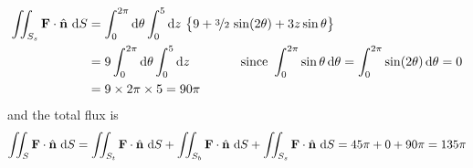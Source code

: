 \begin{eg}
\begin{align*}
\iint_{S_s}\mathbf{F}\cdot\hat{\mathbf{n}}\ \mathrm{d}S
&=\int_0^{2\pi}\mathrm{d}\theta\int_0^5\mathrm{d}z\  
     \big\{9 +\nicefrac{3}{2}\,\sin(2\theta)+3z\sin\theta\big\} \\
&=9\int_0^{2\pi}\mathrm{d}\theta\int_0^5\mathrm{d}z
\qquad\qquad\text{since }\int_0^{2\pi}\sin\theta\,\mathrm{d}\theta
                   =\int_0^{2\pi}\sin(2\theta)\,\mathrm{d}\theta 
                   =0 \\
&=9\times 2\pi\times 5 
=90\pi
\end{align*}
and the total flux is
\begin{align*}
\iint_{S}\mathbf{F}\cdot\hat{\mathbf{n}}\ \mathrm{d}S
=\iint_{S_t}\mathbf{F}\cdot\hat{\mathbf{n}}\ \mathrm{d}S
 +\iint_{S_b}\mathbf{F}\cdot\hat{\mathbf{n}}\ \mathrm{d}S
 +\iint_{S_s}\mathbf{F}\cdot\hat{\mathbf{n}}\ \mathrm{d}S
=45\pi+0+90\pi
=135\pi
\end{align*}



\end{eg}


